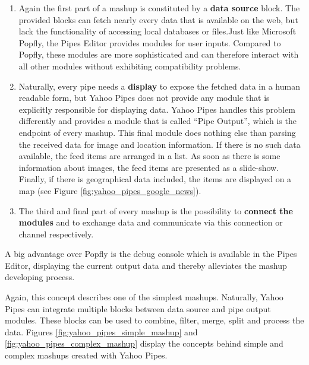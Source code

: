 \begin{enumerate}
  \item Again the first part of a mashup is constituted by a \textbf{data source} block. The provided
  blocks can fetch nearly every data that is available on the web, but lack the functionality of
  accessing local databases or files.\newline Just like Microsoft Popfly, the Pipes Editor provides
  modules for user inputs. Compared to Popfly, these modules are more sophisticated and can therefore
  interact with all other modules without exhibiting compatibility problems.
  \item Naturally, every pipe needs a \textbf{display} to expose the fetched data in a   human
  readable form, but Yahoo Pipes does not provide any module that is explicitly   responsible for
  displaying data. Yahoo Pipes handles this problem differently   and provides a module that is
  called ``Pipe Output'', which is the endpoint   of every mashup. This final module does nothing
  else than parsing the   received data for image and location information. If there is no such data
  available, the feed items are arranged in a list. As soon as there is some information about
  images, the feed items are presented as a slide-show. Finally, if there is   geographical data
  included, the items are displayed on a map (see Figure \ref{fig:yahoo_pipes_google_news}).
  \item The third and final part of every mashup is the possibility to \textbf{connect the modules}  
  and to exchange data and communicate via this connection or channel   respectively.
\end{enumerate}

A big advantage over Popfly is the debug console which is available in the Pipes Editor, displaying
the current output data and thereby alleviates the mashup developing process.
  
Again, this concept describes one of the simplest mashups. Naturally, Yahoo Pipes can integrate
multiple blocks between data source and pipe output modules. These blocks can be used to combine,
filter, merge, split and process the data. Figures \ref{fig:yahoo_pipes_simple_mashup} and
\ref{fig:yahoo_pipes_complex_mashup} display the concepts behind simple and complex mashups created
with Yahoo Pipes.

